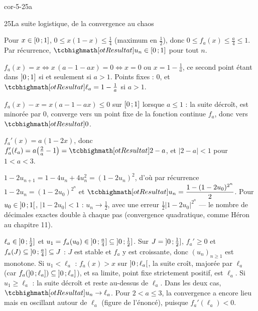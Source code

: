 
\begin{blocLivre}{cor-5-25a}
\begin{corrige}{25}{La suite logistique, de la convergence au chaos}
\begin{questions}
  \item Pour $x\in\mathopen{[}0\,{;}\,1\mathclose{]}$, $0\leqslant x(1-x)\leqslant\frac14$
    (maximum en $\frac12$), donc $0\leqslant f_a(x)\leqslant\frac a4\leqslant1$.
    Par récurrence, $\res{u_n\in\intFF{0}{1}}$ pour tout $n$.
  \item $f_a(x)=x\iff x\,(a-1-ax)=0\iff x=0$ ou $x=1-\frac1a$, ce
    second point étant dans $\mathopen{]}0\,{;}\,1\mathclose{]}$ si et seulement si $a>1$.
    Points fixes : $0$, et $\res{\ell_a=1-\tfrac1a}$ si $a>1$.
  \item $f_a(x)-x=x(a-1-ax)\leqslant0$ sur $\mathopen{[}0\,{;}\,1\mathclose{]}$ lorsque
    $a\leqslant1$ : la suite décroît, est minorée par $0$, converge vers
    un point fixe de la fonction continue $f_a$, donc vers $\res{0}$.
\end{questions}
\begin{questions}[resume]
  \item $f_a'(x)=a(1-2x)$, donc
    $f_a'(\ell_a)=a\bigl(\tfrac2a-1\bigr)=\res{2-a}$, et $|2-a|<1$ pour
    $1<a<3$.
  \item $1-2u_{n+1}=1-4u_n+4u_n^{2}=(1-2u_n)^{2}$, d'où par récurrence
    $1-2u_n=(1-2u_0)^{2^{n}}$ et
    $\res{u_n=\dfrac{1-(1-2u_0)^{2^{n}}}{2}}$. Pour
    $u_0\in\mathopen{]}0\,{;}\,1\mathclose{[}$, $|1-2u_0|<1$ : $u_n\to\frac12$, avec une erreur
    $\frac12|1-2u_0|^{2^{n}}$ — le nombre de décimales exactes double à
    chaque pas (convergence quadratique, comme Héron au chapitre 11).
  \item $\ell_a\in\mathopen{]}0\,{;}\,\frac12\mathclose{]}$ et
    $u_1=f_a(u_0)\in\mathopen{]}0\,{;}\,\frac a4\mathclose{]}\subseteq\mathopen{]}0\,{;}\,\frac12\mathclose{]}$. Sur
    $J=\mathopen{]}0\,{;}\,\frac12\mathclose{]}$, $f_a'\geqslant0$ et
    $f_a(J)\subseteq\mathopen{]}0\,{;}\,\frac a4\mathclose{]}\subseteq J$ : $J$ est stable et
    $f_a$ y est croissante, donc $(u_n)_{n\geqslant1}$ est monotone.
    Si $u_1<\ell_a$ : $f_a(x)>x$ sur $\mathopen{]}0\,{;}\,\ell_a\mathclose{[}$, la suite croît,
    majorée par $\ell_a$ (car $f_a(\mathopen{]}0\,{;}\,\ell_a\mathclose{]})\subseteq\mathopen{]}0\,{;}\,\ell_a\mathclose{]}$),
    et sa limite, point fixe strictement positif, est $\ell_a$. Si
    $u_1\geqslant\ell_a$ : la suite décroît et reste au-dessus de
    $\ell_a$. Dans les deux cas, $\res{u_n\to\ell_a}$. Pour
    $2<a\leqslant3$, la convergence a encore lieu mais en oscillant autour
    de $\ell_a$ (figure de l'énoncé), puisque $f_a'(\ell_a)<0$.
\end{questions}
\end{corrige}
\end{blocLivre}

